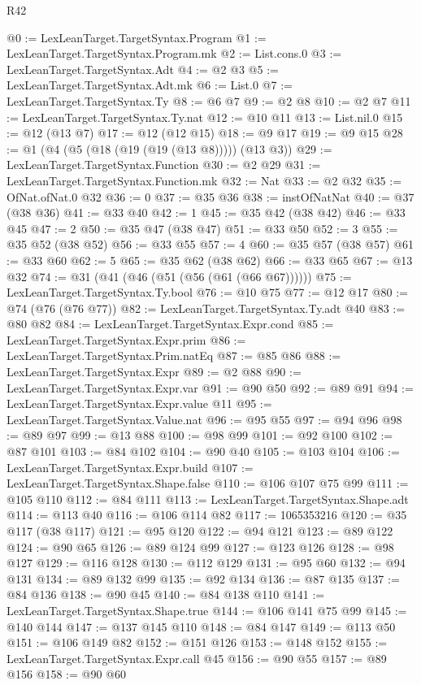 \begin{lexlean}{R42}
\begin{coremodule}
@0 := LexLeanTarget.TargetSyntax.Program
@1 := LexLeanTarget.TargetSyntax.Program.mk
@2 := List.cons.{0}
@3 := LexLeanTarget.TargetSyntax.Adt
@4 := @2 @3
@5 := LexLeanTarget.TargetSyntax.Adt.mk
@6 := List.{0}
@7 := LexLeanTarget.TargetSyntax.Ty
@8 := @6 @7
@9 := @2 @8
@10 := @2 @7
@11 := LexLeanTarget.TargetSyntax.Ty.nat
@12 := @10 @11
@13 := List.nil.{0}
@15 := @12 (@13 @7)
@17 := @12 (@12 @15)
@18 := @9 @17
@19 := @9 @15
@28 := @1 (@4 (@5 (@18 (@19 (@19 (@13 @8))))) (@13 @3))
@29 := LexLeanTarget.TargetSyntax.Function
@30 := @2 @29
@31 := LexLeanTarget.TargetSyntax.Function.mk
@32 := Nat
@33 := @2 @32
@35 := OfNat.ofNat.{0} @32
@36 := 0
@37 := @35 @36
@38 := instOfNatNat
@40 := @37 (@38 @36)
@41 := @33 @40
@42 := 1
@45 := @35 @42 (@38 @42)
@46 := @33 @45
@47 := 2
@50 := @35 @47 (@38 @47)
@51 := @33 @50
@52 := 3
@55 := @35 @52 (@38 @52)
@56 := @33 @55
@57 := 4
@60 := @35 @57 (@38 @57)
@61 := @33 @60
@62 := 5
@65 := @35 @62 (@38 @62)
@66 := @33 @65
@67 := @13 @32
@74 := @31 (@41 (@46 (@51 (@56 (@61 (@66 @67))))))
@75 := LexLeanTarget.TargetSyntax.Ty.bool
@76 := @10 @75
@77 := @12 @17
@80 := @74 (@76 (@76 @77))
@82 := LexLeanTarget.TargetSyntax.Ty.adt @40
@83 := @80 @82
@84 := LexLeanTarget.TargetSyntax.Expr.cond
@85 := LexLeanTarget.TargetSyntax.Expr.prim
@86 := LexLeanTarget.TargetSyntax.Prim.natEq
@87 := @85 @86
@88 := LexLeanTarget.TargetSyntax.Expr
@89 := @2 @88
@90 := LexLeanTarget.TargetSyntax.Expr.var
@91 := @90 @50
@92 := @89 @91
@94 := LexLeanTarget.TargetSyntax.Expr.value @11
@95 := LexLeanTarget.TargetSyntax.Value.nat
@96 := @95 @55
@97 := @94 @96
@98 := @89 @97
@99 := @13 @88
@100 := @98 @99
@101 := @92 @100
@102 := @87 @101
@103 := @84 @102
@104 := @90 @40
@105 := @103 @104
@106 := LexLeanTarget.TargetSyntax.Expr.build
@107 := LexLeanTarget.TargetSyntax.Shape.false
@110 := @106 @107 @75 @99
@111 := @105 @110
@112 := @84 @111
@113 := LexLeanTarget.TargetSyntax.Shape.adt
@114 := @113 @40
@116 := @106 @114 @82
@117 := 1065353216
@120 := @35 @117 (@38 @117)
@121 := @95 @120
@122 := @94 @121
@123 := @89 @122
@124 := @90 @65
@126 := @89 @124 @99
@127 := @123 @126
@128 := @98 @127
@129 := @116 @128
@130 := @112 @129
@131 := @95 @60
@132 := @94 @131
@134 := @89 @132 @99
@135 := @92 @134
@136 := @87 @135
@137 := @84 @136
@138 := @90 @45
@140 := @84 @138 @110
@141 := LexLeanTarget.TargetSyntax.Shape.true
@144 := @106 @141 @75 @99
@145 := @140 @144
@147 := @137 @145 @110
@148 := @84 @147
@149 := @113 @50
@151 := @106 @149 @82
@152 := @151 @126
@153 := @148 @152
@155 := LexLeanTarget.TargetSyntax.Expr.call @45
@156 := @90 @55
@157 := @89 @156
@158 := @90 @60

\end{coremodule}
\end{lexlean}
